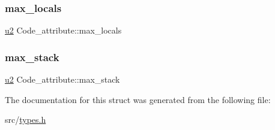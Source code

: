 \mbox{\label{structCode__attribute_ad710ec86a1d37c6daa999383f8f2fd35}} 
\subsubsection{\texorpdfstring{max\+\_\+locals}{max\_locals}}
{\footnotesize\ttfamily \hyperlink{types_8h_ae676e9207f57fb921dca7366b2f59c53}{u2} Code\+\_\+attribute\+::max\+\_\+locals}

\mbox{\label{structCode__attribute_a300885ff1326f01f7c86e7b4425f0d35}} 
\subsubsection{\texorpdfstring{max\+\_\+stack}{max\_stack}}
{\footnotesize\ttfamily \hyperlink{types_8h_ae676e9207f57fb921dca7366b2f59c53}{u2} Code\+\_\+attribute\+::max\+\_\+stack}



The documentation for this struct was generated from the following file\+:\begin{DoxyCompactItemize}
\item 
src/\hyperlink{types_8h}{types.\+h}\end{DoxyCompactItemize}
